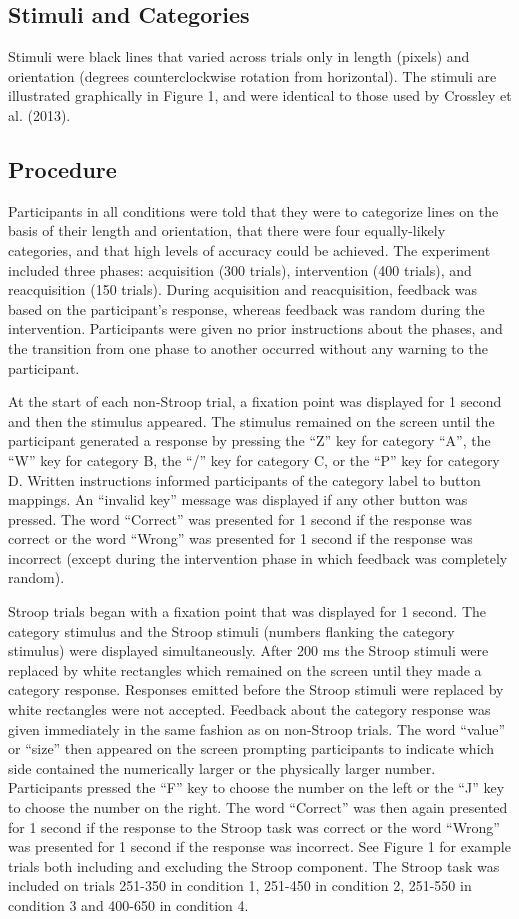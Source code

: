 \documentclass[man,apacite,draftfirst]{apa6}
\begin{document}
\subsection*{Stimuli and Categories}
Stimuli were black lines that varied across trials only in length (pixels) and
orientation (degrees counterclockwise rotation from horizontal). The stimuli are
illustrated graphically in Figure 1, and were identical to those used by
Crossley et al. (2013).

\subsection{Procedure}
Participants in all conditions were told that they were to categorize lines on
the basis of their length and orientation, that there were four equally-likely
categories, and that high levels of accuracy could be achieved. The experiment
included three phases: acquisition (300 trials), intervention (400 trials), and
reacquisition (150 trials). During acquisition and reacquisition, feedback was
based on the participant's response, whereas feedback was random during the
intervention. Participants were given no prior instructions about the phases,
and the transition from one phase to another occurred without any warning to the
participant.

At the start of each non-Stroop trial, a fixation point was displayed for 1
second and then the stimulus appeared. The stimulus remained on the screen until
the participant generated a response by pressing the ``Z'' key for category
``A'', the ``W'' key for category B, the ``/'' key for category C, or the ``P''
key for category D. Written instructions informed participants of the category
label to button mappings. An ``invalid key'' message was displayed if any other
button was pressed. The word ``Correct'' was presented for 1 second if the
response was correct or the word ``Wrong'' was presented for 1 second if the
response was incorrect (except during the intervention phase in which feedback
was completely random).

Stroop trials began with a fixation point that was displayed for 1 second. The
category stimulus and the Stroop stimuli (numbers flanking the category
stimulus) were displayed simultaneously. After 200 ms the Stroop stimuli were
replaced by white rectangles which remained on the screen until they made a
category response. Responses emitted before the Stroop stimuli were replaced by
white rectangles were not accepted. Feedback about the category response was
given immediately in the same fashion as on non-Stroop trials. The word ``value''
or ``size'' then appeared on the screen prompting participants to indicate which
side contained the numerically larger or the physically larger number.
Participants pressed the ``F'' key to choose the number on the left or the ``J''
key to choose the number on the right. The word ``Correct'' was then again
presented for 1 second if the response to the Stroop task was correct or the
word ``Wrong'' was presented for 1 second if the response was incorrect. See
Figure 1 for example trials both including and excluding the Stroop component.
The Stroop task was included on trials 251-350 in condition 1, 251-450 in
condition 2, 251-550 in condition 3 and 400-650 in condition 4.
\end{document}
